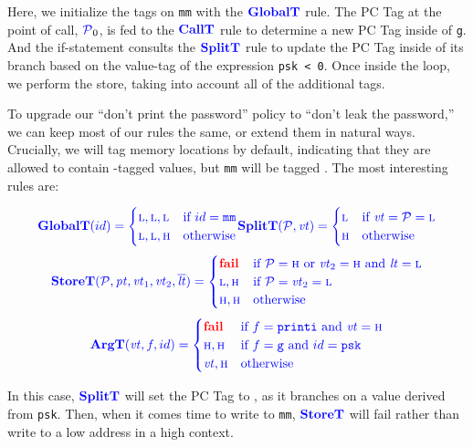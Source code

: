 \documentclass{llncs}
\begin{document}
Here, we initialize the tags on {\tt mm} with the \(\globaltname\) rule. The PC Tag
at the point of call, \(\PCT_0\), is fed to the \(\calltname\) rule to determine a new PC Tag
inside of {\tt g}. And the if-statement consults the \(\splittname\) rule to update the PC Tag
inside of its branch based on the value-tag of the expression {\tt psk < 0}. Once inside the
loop, we perform the store, taking into account all of the additional tags.

To upgrade our ``don't print the password'' policy to ``don't leak the password,'' we can
keep most of our rules the same, or extend them in natural ways. Crucially, we will tag memory
locations \high by default, indicating that they are allowed to contain \high-tagged values,
but {\tt mm} will be tagged \low. The most interesting rules are:

\begin{align*}
  \globaltname(id) =
  \begin{cases}
    \low, \low, \low & \textnormal{if } id = \mathtt{mm} \\
    \low, \low, \high & \textnormal{otherwise} \\
  \end{cases} &
  \splittname(\PCT,\vt) =
  \begin{cases}
    \low & \textnormal{if } \vt = \PCT = \low \\
    \high & \textnormal{otherwise} \\
  \end{cases} \\
\end{align*}
\[\storet = \begin{cases}
  \fail & \textnormal{if } \PCT = \high \textnormal { or } \vt_2 = \high \textnormal{ and } \lt = \low \\
  \low, \high & \textnormal{if } \PCT = \vt_2 = \low \\
  \high, \high & \textnormal{otherwise} \\
\end{cases}\]
\[\argtname(\vt, f, id) = \begin{cases} \fail & \textnormal{if } f=\mathtt{printi} \textnormal{ and } \vt = \high \\
  \high, \high & \textnormal{if } f=\mathtt{g} \textnormal{ and } id = \mathtt{psk} \\
  \vt, \high & \textnormal{otherwise} \\
\end{cases}\]

In this case, \(\splittname\) will set the PC Tag to \high, as it branches on a value derived from {\tt psk}.
Then, when it comes time to write to {\tt mm}, \(\storetname\) will fail rather than write to a low address
in a high context.
\end{document}
